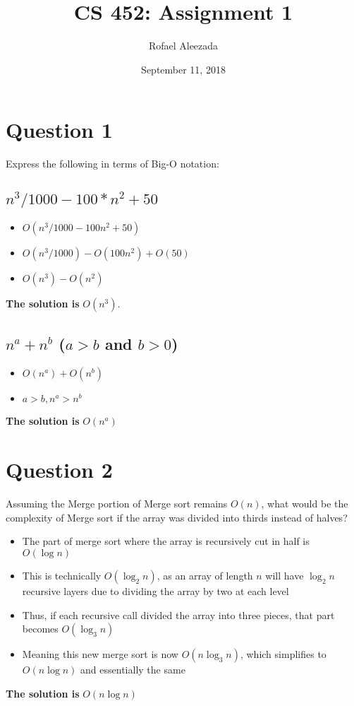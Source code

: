\documentclass{article}
\title{CS 452: Assignment 1}
\date{September 11, 2018}
\author{Rofael Aleezada}
\begin{document}
    \maketitle

    \section{Question 1}
    Express the following in terms of Big-O notation:
        \subsection{$n^3/1000 - 100 * n^2 + 50$}
        	\begin{itemize}
        		\item{$O(n^3 / 1000 - 100n^2 + 50)$}
        		\item{$O(n^3 / 1000) - O(100n^2) + O(50)$}
        		\item{$O(n^3) - O(n^2)$}
        	\end{itemize}
        \textbf{The solution is} $O(n^3)$.

        \subsection{$n^a + n^b$ ($a > b$ and $b > 0$)}
        	\begin{itemize}
        		\item{$O(n^a) + O(n^b)$}
        		\item{$a > b, n^a > n^b$}
        	\end{itemize}
        \textbf{The solution is} $O(n^a)$

    \section{Question 2}
    Assuming the Merge portion of Merge sort remains $O(n)$, what would be the complexity of Merge sort if the array was divided into thirds instead of halves?
        \begin{itemize}
            \item{The part of merge sort where the array is recursively cut in half is $O(\log n)$}
            \item{This is technically $O(\log_2 n)$, as an array of length $n$ will have $\log_2 n$ recursive layers due to dividing the array by two at each level}
            \item{Thus, if each recursive call divided the array into three pieces, that part becomes $O(\log_3 n)$}
            \item{Meaning this new merge sort is now $O(n\log_3 n)$, which simplifies to $O(n\log n)$ and essentially the same}
        \end{itemize}
    \textbf{The solution is} $O(n\log n)$
\end{document}
